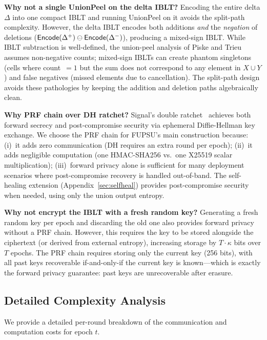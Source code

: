 \smallskip\noindent\textbf{Why not a single UnionPeel on the delta IBLT?}
Encoding the entire delta $\Delta$ into one compact IBLT and running
UnionPeel on it avoids the split-path complexity. However, the delta IBLT
encodes both additions \emph{and} the \emph{negation} of deletions
($\mathsf{Encode}(\Delta^+) \ominus \mathsf{Encode}(\Delta^-)$), producing a mixed-sign
IBLT. While IBLT subtraction is well-defined, the union-peel analysis of
Piske and Trieu~\cite{PT26} assumes non-negative counts; mixed-sign IBLTs
can create phantom singletons (cells where count~$=1$ but the sum does not
correspond to any element in $X \cup Y$) and false negatives (missed elements
due to cancellation). The split-path design avoids these pathologies by
keeping the addition and deletion paths algebraically clean.

\smallskip\noindent\textbf{Why PRF chain over DH ratchet?}
Signal's double ratchet~\cite{Signal} achieves both forward secrecy and
post-compromise security via ephemeral Diffie-Hellman key exchange. We choose
the PRF chain for FUPSU's main construction because: (i)~it adds zero
communication (DH requires an extra round per epoch); (ii)~it adds negligible
computation (one HMAC-SHA256 vs.\ one X25519 scalar multiplication);
(iii)~forward privacy alone is sufficient for many deployment scenarios where
post-compromise recovery is handled out-of-band. The self-healing extension
(Appendix~\ref{sec:selfheal}) provides post-compromise security when needed,
using only the union output entropy.

\smallskip\noindent\textbf{Why not encrypt the IBLT with a fresh random key?}
Generating a fresh random key per epoch and discarding the old one also
provides forward privacy without a PRF chain. However, this requires the key
to be stored alongside the ciphertext (or derived from external entropy),
increasing storage by $T \cdot \kappa$ bits over $T$ epochs. The PRF chain
requires storing only the current key (256 bits), with all past keys
recoverable if-and-only-if the current key is known---which is exactly the
forward privacy guarantee: past keys are unrecoverable after erasure.

\subsection{Detailed Complexity Analysis}

We provide a detailed per-round breakdown of the communication and
computation costs for epoch $t$.

